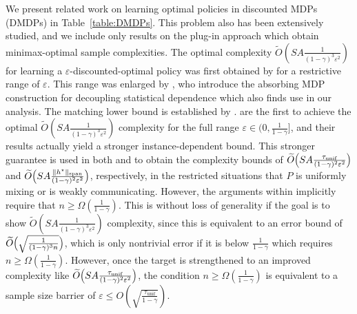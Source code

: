 \documentclass{article}
\theoremstyle{plain}
\theoremstyle{plain}
\theoremstyle{remark}
\theoremstyle{plain}
\theoremstyle{plain}
\newcommand{\pihat}{\widehat{\pi}}
\newcommand{\Otilde}{\widetilde{O}}
\newcommand{\tmix}{\tau_{\mathrm{unif}}}
\newcommand\cig[1]{\scalerel*[5.5pt]{\Big#1}{%
  \ensurestackMath{\addstackgap[1.5pt]{\big#1}}}}
\newcommand\cigl[1]{\mathopen{\cig{#1}}}
\newcommand\cigr[1]{\mathclose{\cig{#1}}}
\newcommand{\plugin}{plug-in\xspace}
\begin{document}
We present related work on learning optimal policies in discounted MDPs (DMDPs) in Table~\ref{table:DMDPs}. This problem also has been extensively studied, and we include only results on the \plugin approach which obtain minimax-optimal sample complexities. The optimal complexity $\Otilde(SA \frac{1}{(1-\gamma)^3 \varepsilon^2})$ for learning a $\varepsilon$-discounted-optimal policy was first obtained by \cite{azar_minimax_2013} for a restrictive range of $\varepsilon$. This range was enlarged by \cite{agarwal_model-based_2020}, who introduce the absorbing MDP construction for decoupling statistical dependence which also finds use in our analysis. The matching lower bound is established by \cite{azar_sample_2012, sidford_near-optimal_2018}.
\cite{li_breaking_2020} are the first to achieve the optimal $\Otilde(SA \frac{1}{(1-\gamma)^3 \varepsilon^2})$ complexity for the full range $\varepsilon \in (0, \frac{1}{1-\gamma}]$, and their results actually yield a stronger instance-dependent bound. This stronger guarantee is used in both \cite{wang_optimal_2023} and \cite{zurek_span-based_2025} to obtain the complexity bounds of $\Otilde\cig(SA \frac{\tmix}{(1-\gamma)^2\varepsilon^2} \cig)$ and $\Otilde\cig(SA \frac{\spannorm{h^\star}}{(1-\gamma)^2\varepsilon^2} \cig)$, respectively, in the restricted situations that $P$ is uniformly mixing or is weakly communicating. However, the arguments within \cite{li_breaking_2020} implicitly require that $n \geq \Omega(\frac{1}{1-\gamma})$. This is without loss of generality if the goal is to show $\Otilde(SA \frac{1}{(1-\gamma)^3 \varepsilon^2})$ complexity, since this is equivalent to an error bound of $\Otilde\cigl(\sqrt{\frac{1}{(1-\gamma)^3n}} \cigr)$, which is only nontrivial error if it is below $\frac{1}{1-\gamma}$ which requires $n \geq \Omega(\frac{1}{1-\gamma})$. 
However, once the target is strengthened to an improved complexity like $\Otilde\cig(SA \frac{\tmix}{(1-\gamma)^2\varepsilon^2} \cig)$, the condition $n \geq \Omega(\frac{1}{1-\gamma})$ is equivalent to a sample size barrier of $\varepsilon \leq O(\sqrt{\frac{\tmix}{1-\gamma}})$. 
\end{document}
